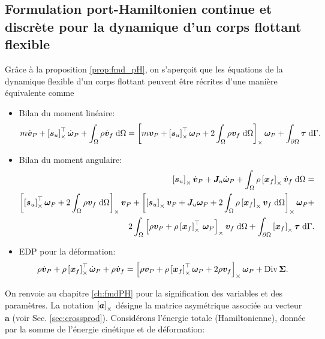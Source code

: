 \subsection*{Formulation port-Hamiltonien continue et discrète pour la dynamique d'un corps flottant flexible}
Grâce à la proposition \ref{prop:fmd_pH}, on s'aperçoit que les équations de la dynamique flexible d'un corps flottant \cite[Chapitre 4]{simeon2013computational} peuvent être récrites d'une manière équivalente comme
\begin{itemize}
	\item Bilan du moment linéaire:
	\begin{equation*}
	\begin{split}
	m\dot{\bm{v}}_P + \crmat{\bm{s}_u}^\top \dot{\bm{\omega}}_P +   \int_{\Omega} \rho \dot{\bm{v}}_f \d{\Omega}  = 	\crmat{m {\bm{v}_P} + {\crmat{\bm{s}_u}^\top \bm\omega_P} +2 \int_{\Omega} \rho {\bm{v}_f} \d{\Omega}} \bm\omega_P + \int_{\partial \Omega} \bm\tau \d{\Gamma}.
	\end{split}
	\end{equation*}
	\item Bilan du moment angulaire:
	\begin{equation*}
	\begin{split}
	\crmat{\bm{s}_u} \dot{\bm{v}}_P  + \bm{J}_u \dot{\bm\omega}_P + \int_{\Omega} \rho \crmat{\bm{x}_f} \dot{\bm{v}}_f \d{\Omega} = \\
	\crmat{\crmat{\bm{s}_u}^\top \bm\omega_P + 2 \int_{\Omega} \rho {\bm{v}_f} \d{\Omega}} \bm{v}_P + \crmat{\crmat{\bm{s}_u} \bm{v}_P + {\bm{J}_u \bm\omega_P} + 2 \int_{\Omega} \rho \crmat{\bm{x}_f} {\bm{v}}_f \d{\Omega}} \bm\omega_P + 
	\\
	2 \int_{\Omega} \left[\rho \bm{v}_P + \rho \crmat{\bm{x}_f}^\top \, \bm\omega_P\right]_\times \bm{v}_f \d{\Omega} + \int_{\partial \Omega}\crmat{\bm{x}_f} \bm{\tau} \d{\Gamma}.
	\end{split}
	\end{equation*}
	\item EDP pour la déformation:
	\begin{equation*}
	\rho \dot{\bm{v}}_P + \rho \left[\bm{x}_f\right]_\times^\top \dot{\bm\omega}_P  + \rho \dot{\bm{v}}_f = \left[\rho \bm{v}_P + \rho \left[\bm{x}_f\right]_\times^\top \bm\omega_P + 2 \rho \bm{v}_f\right]_\times \bm\omega_P + \operatorname*{Div}{\bm\Sigma}.
	\end{equation*}
\end{itemize}
On renvoie au chapitre \ref{ch:fmdPH} pour la signification des variables et des paramètres. La notation $\left[\bm{a}\right]_\times$ désigne la matrice asymétrique associée au vecteur $\bm{a} $ (voir Sec. \ref{sec:crossprod}). Considérons l'énergie totale (Hamiltonienne), donnée par la somme de l'énergie cinétique et de déformation:

